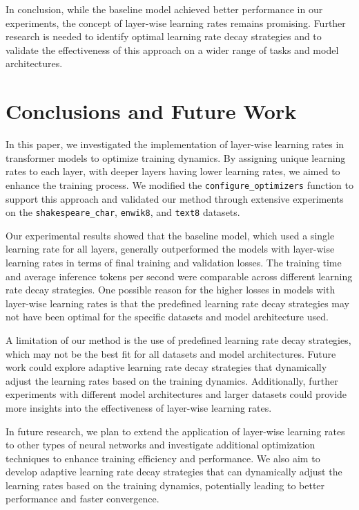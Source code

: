 \documentclass{article} %
\begin{document}
In conclusion, while the baseline model achieved better performance in our experiments, the concept of layer-wise learning rates remains promising. Further research is needed to identify optimal learning rate decay strategies and to validate the effectiveness of this approach on a wider range of tasks and model architectures.

\section{Conclusions and Future Work}
\label{sec:conclusion}

In this paper, we investigated the implementation of layer-wise learning rates in transformer models to optimize training dynamics. By assigning unique learning rates to each layer, with deeper layers having lower learning rates, we aimed to enhance the training process. We modified the \texttt{configure\_optimizers} function to support this approach and validated our method through extensive experiments on the \texttt{shakespeare\_char}, \texttt{enwik8}, and \texttt{text8} datasets.

Our experimental results showed that the baseline model, which used a single learning rate for all layers, generally outperformed the models with layer-wise learning rates in terms of final training and validation losses. The training time and average inference tokens per second were comparable across different learning rate decay strategies. One possible reason for the higher losses in models with layer-wise learning rates is that the predefined learning rate decay strategies may not have been optimal for the specific datasets and model architecture used.

A limitation of our method is the use of predefined learning rate decay strategies, which may not be the best fit for all datasets and model architectures. Future work could explore adaptive learning rate decay strategies that dynamically adjust the learning rates based on the training dynamics. Additionally, further experiments with different model architectures and larger datasets could provide more insights into the effectiveness of layer-wise learning rates.

In future research, we plan to extend the application of layer-wise learning rates to other types of neural networks and investigate additional optimization techniques to enhance training efficiency and performance. We also aim to develop adaptive learning rate decay strategies that can dynamically adjust the learning rates based on the training dynamics, potentially leading to better performance and faster convergence.



\end{document}
